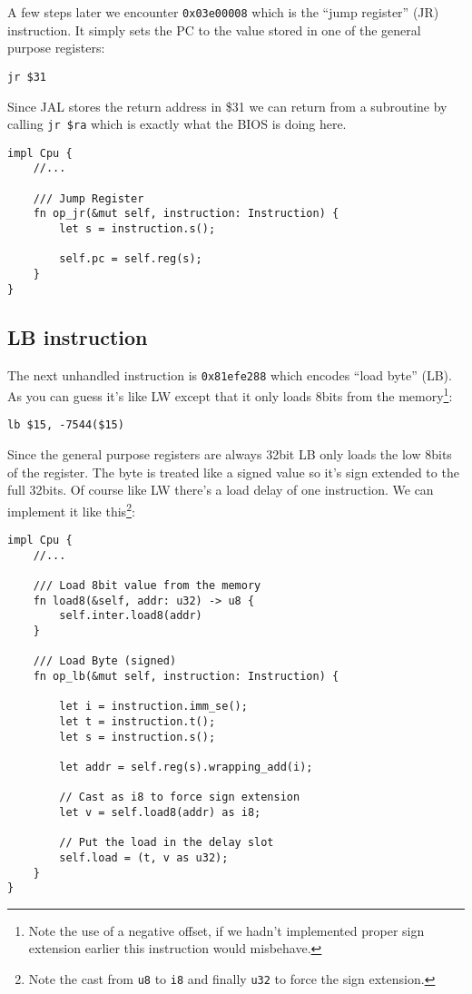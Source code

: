 \documentclass[a4paper]{article}
\newcommand{\code}[1] {\texttt{#1}}
\begin{document}
A few steps later we encounter \code{0x03e00008} which is the ``jump
register'' (JR) instruction. It simply sets the PC to the value stored
in one of the general purpose registers:

\begin{lstlisting}[language=assembly]
jr $31
\end{lstlisting}

Since JAL stores the return address in \$31 we can return from a
subroutine by calling \code{jr \$ra} which is exactly what the BIOS
is doing here.

\begin{lstlisting}
impl Cpu {
    //...

    /// Jump Register
    fn op_jr(&mut self, instruction: Instruction) {
        let s = instruction.s();

        self.pc = self.reg(s);
    }
}
\end{lstlisting}

\subsection{LB instruction}

The next unhandled instruction is \code{0x81efe288} which encodes
``load byte'' (LB). As you can guess it's like LW except that it only
loads 8bits from the memory\footnote{Note the use of a negative
  offset, if we hadn't implemented proper sign extension earlier this
  instruction would misbehave.}:

\begin{lstlisting}[language=assembly]
lb $15, -7544($15)
\end{lstlisting}

Since the general purpose registers are always 32bit LB only loads the
low 8bits of the register. The byte is treated like a signed value so
it's sign extended to the full 32bits. Of course like LW there's a
load delay of one instruction. We can implement it like
this\footnote{Note the cast from \code{u8} to \code{i8} and finally
  \code{u32} to force the sign extension.}:

\begin{lstlisting}
impl Cpu {
    //...

    /// Load 8bit value from the memory
    fn load8(&self, addr: u32) -> u8 {
        self.inter.load8(addr)
    }

    /// Load Byte (signed)
    fn op_lb(&mut self, instruction: Instruction) {

        let i = instruction.imm_se();
        let t = instruction.t();
        let s = instruction.s();

        let addr = self.reg(s).wrapping_add(i);

        // Cast as i8 to force sign extension
        let v = self.load8(addr) as i8;

        // Put the load in the delay slot
        self.load = (t, v as u32);
    }
}
\end{lstlisting}
\end{document}
